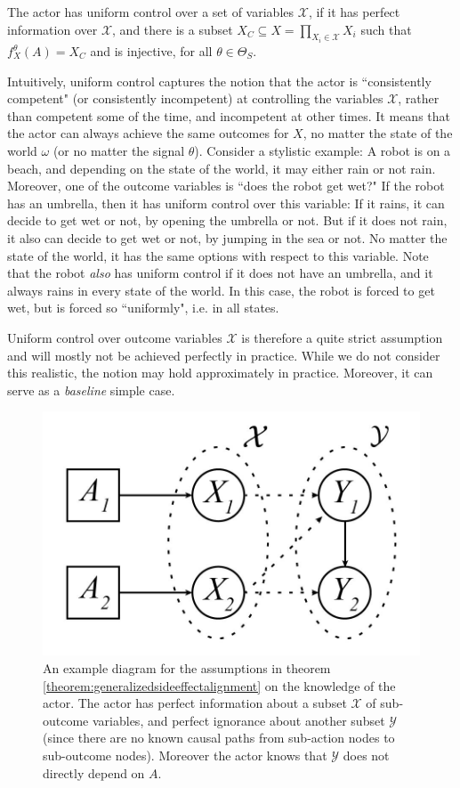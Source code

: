 \begin{definition}
	The actor has uniform control over a set of variables $\mathcal X$, if it has perfect information over $\mathcal X$, and there is a subset $X_C\subseteq X=\prod_{X_i\in \mathcal X}X_i$ such that $f_X^\theta(A)=X_C$ and is injective, for all $\theta\in \Theta_S$.
\end{definition}

Intuitively, uniform control captures the notion that the actor is ``consistently competent" (or consistently incompetent) at controlling the variables $\mathcal X$, rather than competent some of the time, and incompetent at other times. It means that the actor can always achieve the same outcomes for $X$, no matter the state of the world $\omega$ (or no matter the signal $\theta$). Consider a stylistic example: A robot is on a beach, and depending on the state of the world, it may either rain or not rain. Moreover, one of the outcome variables is ``does the robot get wet?" If the robot has an umbrella, then it has uniform control over this variable: If it rains, it can decide to get wet or not, by opening the umbrella or not. But if it does not rain, it also can decide to get wet or not, by jumping in the sea or not. No matter the state of the world, it has the same options with respect to this variable. Note that the robot \textit{also} has uniform control if it does not have an umbrella, and it always rains in every state of the world. In this case, the robot is forced to get wet, but is forced so ``uniformly", i.e. in all states. 

Uniform control over outcome variables $\mathcal X$ is therefore a quite strict assumption and will mostly not be achieved perfectly in practice. While we do not consider this realistic, the notion may hold approximately in practice. Moreover, it can serve as a \textit{baseline} simple case.


\begin{figure}[h]
	\centering
	\captionsetup{labelfont=bf,font=small,labelsep=period}
	\includegraphics[width=0.4\linewidth]{"images/theorem-examples/theorem1illustration"}
	\caption{\rightskip=20pt\leftskip=20pt  An example diagram for the assumptions in theorem \ref{theorem:generalizedsideeffectalignment} on the knowledge of the actor. The actor has perfect information about a subset $\mathcal X$ of sub-outcome variables, and perfect ignorance about another subset $\mathcal Y$ (since there are no known causal paths from sub-action nodes to sub-outcome nodes). Moreover the actor knows that $\mathcal Y$ does not directly depend on $A$.}
	\label{fig:theorem1illustration} 	
\end{figure}
 
